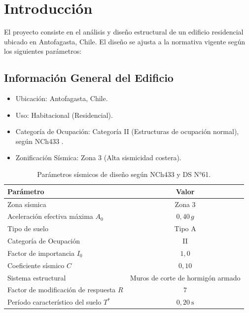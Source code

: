 \section{Introducción}

El proyecto consiste en el análisis y diseño estructural de un edificio residencial ubicado en Antofagasta, Chile. El diseño se ajusta a la normativa vigente según los siguientes parámetros:

\subsection{Información General del Edificio}
\begin{itemize}
    \item Ubicación: Antofagasta, Chile.
    \item Uso: Habitacional (Residencial).
    \item Categoría de Ocupación: Categoría II (Estructuras de ocupación normal), según NCh433 \cite{NCh433:1996}.
    \item Zonificación Sísmica: Zona 3 (Alta sismicidad costera).
\end{itemize}

\begin{table}[H]
    \centering
    \caption{Parámetros sísmicos de diseño según NCh433 y DS N°61.}
    \label{tab:parametros_sismicos}
    \begin{tabular}{lc}
        \hline
        \textbf{Parámetro} & \textbf{Valor} \\
        \hline
        Zona sísmica                                    & Zona 3 \\
        Aceleración efectiva máxima $A_0$               & $0{,}40\,g$ \\
        Tipo de suelo                                   & Tipo A \\
        Categoría de Ocupación                         & II \\
        Factor de importancia $I_0$                    & $1{,}0$ \\
        Coeficiente sísmico $C$                        & $0{,}10$ \\
        Sistema estructural                             & Muros de corte de hormigón armado \\
        Factor de modificación de respuesta $R$        & $7$ \\
        Período característico del suelo $T^*$         & $0{,}20\ \text{s}$ \\
        \hline
    \end{tabular}
\end{table}

